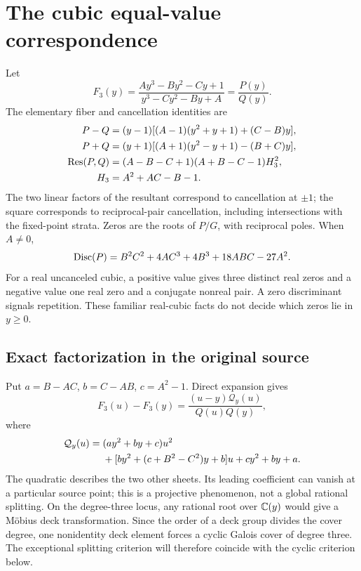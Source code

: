 \section{The cubic equal-value correspondence}\label{sec:cubic}
Let
\begin{equation}\label{eq:cubic_original}
 F_3(y)=\frac{Ay^3-By^2-Cy+1}{y^3-Cy^2-By+A}=\frac{P(y)}{Q(y)}.
\end{equation}
The elementary fiber and cancellation identities are
\begin{align}\label{eq:cubic_fibers}
 P-Q&=(y-1)[(A-1)(y^2+y+1)+(C-B)y],\notag\\
 P+Q&=(y+1)[(A+1)(y^2-y+1)-(B+C)y],\\
 \operatorname{Res}(P,Q)&=(A-B-C+1)(A+B-C-1)H_3^2,\label{eq:cubic_resultant}\\
 H_3&=A^2+AC-B-1.\notag
\end{align}
The two linear factors of the resultant correspond to cancellation at \(\pm1\); the square corresponds to reciprocal-pair cancellation, including intersections with the fixed-point strata. Zeros are the roots of \(P/G\), with reciprocal poles. When \(A\ne0\),
\begin{equation}\label{eq:cubic_zero_disc}
 \operatorname{Disc}(P)=B^2C^2+4AC^3+4B^3+18ABC-27A^2.
\end{equation}
For a real uncanceled cubic, a positive value gives three distinct real zeros and a negative value one real zero and a conjugate nonreal pair. A zero discriminant signals repetition. These familiar real-cubic facts do not decide which zeros lie in \(y\ge0\).

\subsection{Exact factorization in the original source}
Put \(a=B-AC\), \(b=C-AB\), \(c=A^2-1\). Direct expansion gives
\begin{equation}\label{eq:original_factor}
 F_3(u)-F_3(y)=\frac{(u-y)\mathcal Q_y(u)}{Q(u)Q(y)},
\end{equation}
where
\begin{align}\label{eq:original_residual}
 \mathcal Q_y(u)={}&(ay^2+by+c)u^2\notag\\
 &+[by^2+(c+B^2-C^2)y+b]u+cy^2+by+a.
\end{align}
The quadratic describes the two other sheets. Its leading coefficient can vanish at a particular source point; this is a projective phenomenon, not a global rational splitting. On the degree-three locus, any rational root over \(\mathbb C(y)\) would give a Möbius deck transformation. Since the order of a deck group divides the cover degree, one nonidentity deck element forces a cyclic Galois cover of degree three. The exceptional splitting criterion will therefore coincide with the cyclic criterion below.

